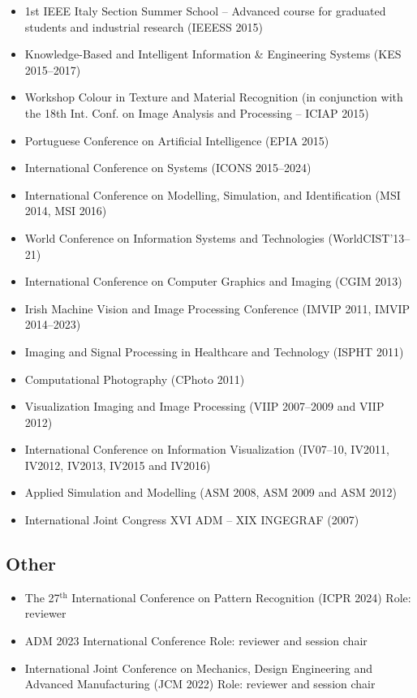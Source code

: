 \documentclass[11pt]{article}
\begin{document}
\begin{itemize}
  \item 1st IEEE Italy Section Summer School – Advanced course for graduated students and industrial research (IEEESS 2015)
  \item Knowledge-Based and Intelligent Information \& Engineering Systems (KES 2015--2017)
  \item Workshop Colour in Texture and Material Recognition (in conjunction with the 18th Int. Conf. on Image Analysis and Processing – ICIAP 2015)
  \item Portuguese Conference on Artificial Intelligence (EPIA 2015)
  \item International Conference on Systems (ICONS 2015--2024)
  \item International Conference on Modelling, Simulation, and Identification (MSI 2014, MSI 2016)
  \item World Conference on Information Systems and Technologies (WorldCIST'13--21)
  \item International Conference on Computer Graphics and Imaging (CGIM 2013)
  \item Irish Machine Vision and Image Processing Conference (IMVIP 2011, IMVIP 2014--2023)
  \item Imaging and Signal Processing in Healthcare and Technology (ISPHT 2011)
  \item Computational Photography (CPhoto 2011)
  \item Visualization Imaging and Image Processing (VIIP 2007--2009 and VIIP 2012) 
  \item International Conference on Information Visualization (IV07--10, IV2011, IV2012, IV2013, IV2015 and IV2016)
  \item Applied Simulation and Modelling (ASM 2008, ASM 2009 and ASM 2012)
  \item International Joint Congress XVI ADM -- XIX INGEGRAF (2007)
\end{itemize}

\subsection*{Other}
\begin{itemize}
	\item The 27$^\text{th}$ International Conference on Pattern Recognition (ICPR 2024) \hfill Role: reviewer
	\item ADM 2023 International Conference \hfill Role: reviewer and session chair
	\item International Joint Conference on Mechanics, Design Engineering and Advanced Manufacturing (JCM 2022) \hfill Role: reviewer and session chair
\end{itemize} 
\end{document}
